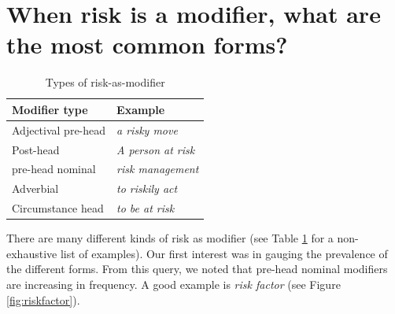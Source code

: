 



		\section{When risk is a modifier, what are the most common forms?} \label{sect:riskmod}
		\FloatBarrier

            \begin{table}
            \small
            \centering
            \begin{tabular}{|l|l|}
            \hline
            \textbf{Modifier type}       & \textbf{Example}          \\ \hline
            Adjectival pre-head & \emph{a risky move}     \\ \hline
            Post-head           & \emph{A person at risk} \\ \hline
            pre-head nominal    & \emph{risk management}  \\ \hline
            Adverbial           & \emph{to riskily act}   \\ \hline
            Circumstance head   & \emph{to be at risk }   \\ \hline
            \end{tabular}
            \caption{Types of risk-as-modifier}
            \label{tab:modriskwords}
            \end{table}

            There are many different kinds of risk as modifier (see Table \ref{tab:modriskwords} for a non-exhaustive list of examples). Our first interest was in gauging the prevalence of the different forms. From this query, we noted that pre-head nominal modifiers are increasing in frequency. A good example is \emph{risk factor} (see Figure \ref{fig:riskfactor}).



